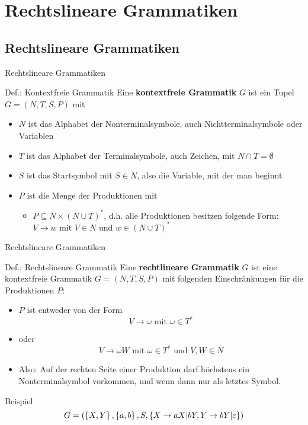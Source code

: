\section{Rechtslineare Grammatiken}
\subsection{Rechtslineare Grammatiken}

\begin{frame}{Rechtslineare Grammatiken}
\begin{block}{Def.: Kontextfreie Grammatik}
	Eine \textbf{kontextfreie Grammatik} $G$ ist ein Tupel $G = (N,T,S,P)$ mit
	\begin{itemize}
		\item $N$ ist das Alphabet der Nonterminalsymbole, auch Nichtterminalsymbole oder Variablen
		\item $T$ ist das Alphabet der Terminalsymbole, auch Zeichen, mit $N \cap T = \emptyset$
		\item $S$ ist das Startsymbol mit $S \in N$, also die Variable, mit der man beginnt
		\item $P$ ist die Menge der Produktionen mit
			\begin{itemize}
				\item $P \subseteq N \times (N \cup T)^*$, d.h. alle Produktionen besitzen folgende Form:\\
				$V \to w \text{ mit } V \in N \text{ und } w \in (N \cup T)^*$
			\end{itemize}
	\end{itemize}
\end{block}
\end{frame}

\begin{frame}{Rechtslineare Grammatiken}
\begin{block}{Def.: Rechtslineare Grammatik}
	Eine \textbf{rechtlineare Grammatik} $G$ ist eine kontextfreie Grammatik $G = (N,T,S,P)$ mit folgenden Einschränkungen für die Produktionen $P$:\\
	\begin{itemize}
			\item $P$ ist entweder von der Form \[
		V \to \omega \text{ mit } \omega \in T^*
	\]
	\item oder \[
		V \to \omega W \text{ mit } \omega \in T^* \text{ und } V,W \in N
	\]
	\item Also: Auf der rechten Seite einer Produktion darf höchstens ein Nonterminalsymbol vorkommen, und wenn dann nur als letztes Symbol.
	\end{itemize}
\end{block}
\pause
\begin{exampleblock}{Beispiel}
	\[
		G = (\left\{ X,Y \right\}, \left\{ a,b \right\}, S, \left\{ X \to aX | bY, Y \to bY | \varepsilon \right\})
	\]
\end{exampleblock}
\end{frame}

